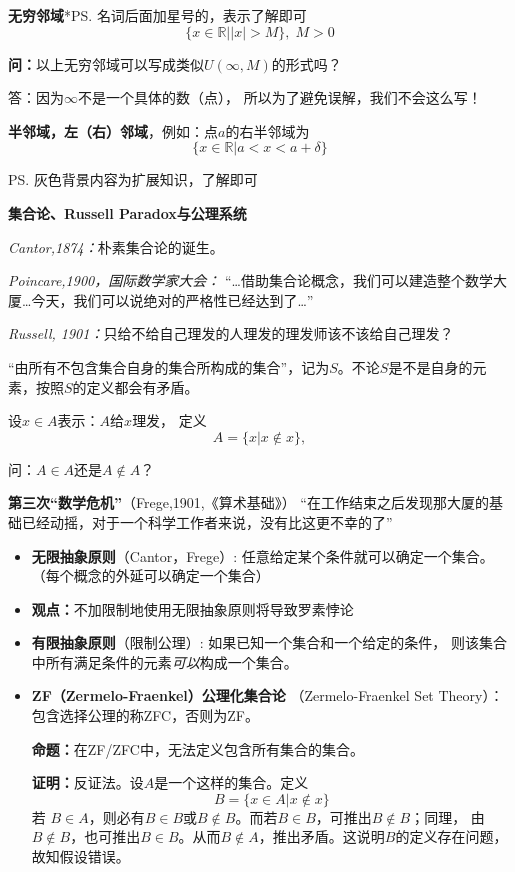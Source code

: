 {\bf 无穷邻域}*\ps{名词后面加星号的，表示了解即可}
$$\{x\in\mathbb{R}||x|>M\},\;M>0$$

{\bf 问：}以上无穷邻域可以写成类似$U(\infty,M)$的形式吗？

答：因为$\infty$不是一个具体的数（点），
所以为了避免误解，我们不会这么写！

{\bf 半邻域，左（右）邻域}，例如：点$a$的右半邻域为
$$\{x\in\mathbb{R}|a<x<a+\delta\}$$

\ps{灰色背景内容为扩展知识，了解即可}

\begin{shaded}

{\bf 集合论、Russell Paradox与公理系统}

	{\it Cantor,1874：}朴素集合论的诞生。	

	{\it Poincare,1900，国际数学家大会：} 
		 {“\ldots 借助集合论概念，我们可以建造整个数学大厦\ldots  今天，我们可以说绝对的严格性已经达到了\ldots”}
	
	{\it Russell, 1901：}只给不给自己理发的人理发的理发师该不该给自己理发？
	
	“由所有不包含集合自身的集合所构成的集合”，记为$S$。不论$S$是不是自身的元素，按照$S$的定义都会有矛盾。
	
	设$x\in A$表示：$A$给$x$理发， 定义
	$$A=\{x|x\notin x\},$$ 
	
	问：$A\in A$还是$A\notin A$？ 
	
	{{\bf {第三次“数学危机”}}（Frege,1901,《算术基础》）}
		“在工作结束之后发现那大厦的基础已经动摇，对于一个科学工作者来说，没有比这更不幸的了”
		
	\begin{itemize}
	  \item {{\bf 无限抽象原则}（Cantor，Frege）:} 任意给定某个条件就可以确定一个集合。（每个概念的外延可以确定一个集合）
	  \item {\bf 观点：}不加限制地使用无限抽象原则将导致罗素悖论
	  \item {{\bf 有限抽象原则}（限制公理）:} 如果已知一个集合和一个给定的条件，
	  则该集合中所有满足条件的元素{\it 可以}构成一个集合。
	  \item {\bf ZF（Zermelo-Fraenkel）公理化集合论}
	  （Zermelo-Fraenkel Set Theory）：包含选择公理的称ZFC，否则为ZF。
	  
	  {\bf 命题：}在ZF/ZFC中，无法定义包含所有集合的集合。
	
	{\bf 证明：}反证法。设$A$是一个这样的集合。定义
	$$B=\{x\in A|x\notin x\}$$
	若
	$B\in A$，则必有$B\in B$或$B\notin B$。而若$B\in B$，可推出$B\notin B$；同理，
	由$B\notin B$，也可推出$B\in B$。从而$B\notin A$，推出矛盾。这说明$B$的定义存在问题，故知假设错误。


\end{itemize}
\end{shaded}

